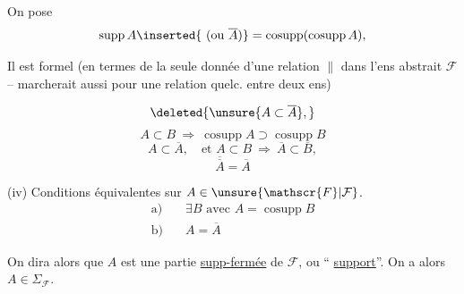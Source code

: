 On  pose
\[
\operatorname{supp}A\inserted{\ (\text{ou }\overline A)}=\operatorname{cosupp}(\operatorname{cosupp}A),
\]


Il est formel (en termes de la seule donnée d'une relation $\parallel$ dans l'ens abstrait $\mathscr{F}$ --  marcherait aussi pour une relation quelc. entre deux ens)


\[
\deleted{\unsure{A\subset\overline A},}
\]
\[
A\subset B\ \Longrightarrow\ \operatorname{cosupp}A\supset\operatorname{cosupp}B
\tag*{(i)}
\]
\[
A\subset\overline A,\quad\text{et }A\subset B\ \Longrightarrow\ \overline A\subset\overline B,
\tag*{(ii)}
\]
\[
\overline{\overline A}=\overline A
\tag*{(iii)}
\]

(iv) Conditions équivalentes sur $A\in\unsure{\mathscr{F}|\mathcal{F}}$.
\[
\begin{aligned}
\text{a)}\quad&\exists B\text{ avec }A=\operatorname{cosupp}B\\
\text{b)}\quad&A=\overline A
\end{aligned}
\]

On dira alors que $A$ est une partie \uline{supp-fermée} de $\mathscr{F}$,  ou `` \uline{support}''.  On a alors $A\in\Sigma_{\mathscr{F}}$.

